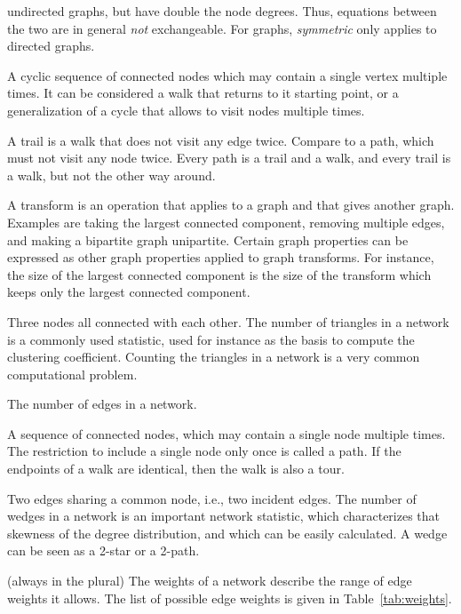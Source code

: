 \documentclass{article}
\begin{document}
\begin{description}
    undirected graphs, but have double the node degrees.  Thus,
    equations between the two are in general \emph{not} exchangeable.
    For graphs, \emph{symmetric} only applies to directed graphs. 
  \item[Tour]
    A cyclic sequence of connected nodes which may contain a single
    vertex multiple times.  It can be considered a walk that returns to
    it starting point, or a generalization of a cycle that allows to
    visit nodes multiple times.  
  \item[Trail] A trail is a walk that does not visit any edge twice.
    Compare to a path, which must not visit any node twice.  Every path
    is a trail and a walk, and every trail is a walk, but not the other
    way around. 
  \item[Transform] 
    A transform is an operation that applies to a graph and that gives
    another graph.  Examples are taking the largest connected component,
    removing multiple edges, and making a bipartite graph unipartite.
    Certain graph properties can be expressed as other graph properties
    applied to graph transforms.  For instance, the size of the largest
    connected component is the size of the transform which keeps only
    the largest connected component. 
  \item[Triangle]
    Three nodes all connected with each other.  The number of triangles
    in a network is a commonly used statistic, used for instance as
    the basis to compute the clustering coefficient.  Counting the
    triangles in a network is a very common computational problem.  
  \item[Volume]
    The number of edges in a network.  
  \item[Walk]
    A sequence of connected nodes, which may contain a single node
    multiple times.  The restriction to include a single node only once
    is called a path.  If the endpoints of a walk are identical, then
    the walk is also a tour.  
  \item[Wedge] 
    Two edges sharing a common node, i.e., two incident edges.  The
    number of wedges in a network is an important network statistic,
    which characterizes that skewness of the degree distribution, and
    which can be easily calculated.  A wedge can be seen as a 2-star or
    a 2-path.  
  \item[Weights] (always in the plural)
    The weights of a network describe the range of edge weights it
    allows.  The list of possible edge weights is given in
    Table~\ref{tab:weights}.  
\end{description}
\end{document}
